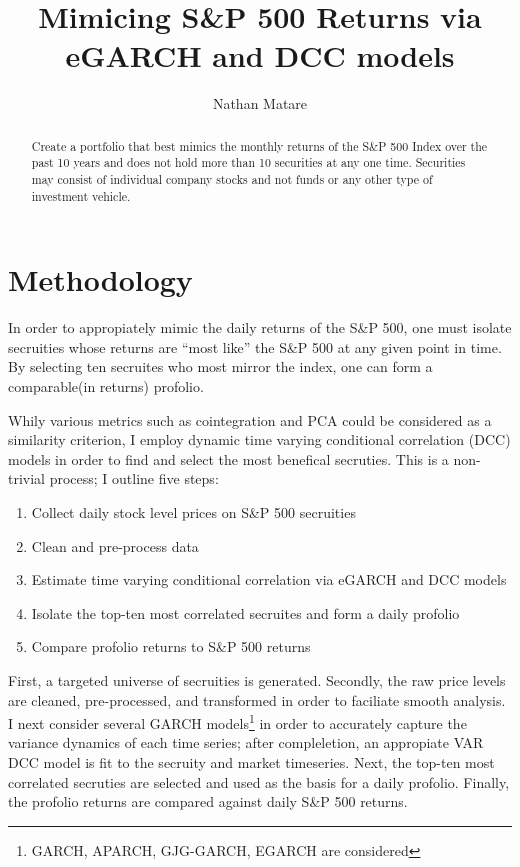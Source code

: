 \documentclass[]{elsarticle} %
\providecommand{\tightlist}{%
  \setlength{\itemsep}{0pt}\setlength{\parskip}{0pt}}
\begin{document}
\begin{frontmatter}

  \title{Mimicing S\&P 500 Returns via eGARCH and DCC models}
    \author[]{Nathan Matare}
  
  
      \address[]{The University of Chicago Booth School of Business}
    \address[Another University]{nmatare@chicagobooth.edu}
  
  \begin{abstract}
  Create a portfolio that best mimics the monthly returns of the S\&P 500
  Index over the past 10 years and does not hold more than 10 securities
  at any one time. Securities may consist of individual company stocks and
  not funds or any other type of investment vehicle.
  \end{abstract}
  
 \end{frontmatter}

\section{Methodology}\label{methodology}

In order to appropiately mimic the daily returns of the S\&P 500, one
must isolate secruities whose returns are ``most like'' the S\&P 500 at
any given point in time. By selecting ten secruites who most mirror the
index, one can form a comparable(in returns) profolio.

Whily various metrics such as cointegration and PCA could be considered
as a similarity criterion, I employ dynamic time varying conditional
correlation (DCC) models in order to find and select the most benefical
secruties. This is a non-trivial process; I outline five steps:

\begin{enumerate}
\def\labelenumi{\arabic{enumi}.}
\tightlist
\item
  Collect daily stock level prices on S\&P 500 secruities
\item
  Clean and pre-process data
\item
  Estimate time varying conditional correlation via eGARCH and DCC
  models
\item
  Isolate the top-ten most correlated secruites and form a daily
  profolio
\item
  Compare profolio returns to S\&P 500 returns
\end{enumerate}

First, a targeted universe of secruities is generated. Secondly, the raw
price levels are cleaned, pre-processed, and transformed in order to
faciliate smooth analysis. I next consider several GARCH
models\footnote{GARCH, APARCH, GJG-GARCH, EGARCH are considered} in
order to accurately capture the variance dynamics of each time series;
after compleletion, an appropiate VAR DCC model is fit to the secruity
and market timeseries. Next, the top-ten most correlated secruties are
selected and used as the basis for a daily profolio. Finally, the
profolio returns are compared against daily S\&P 500 returns.
\end{document}

